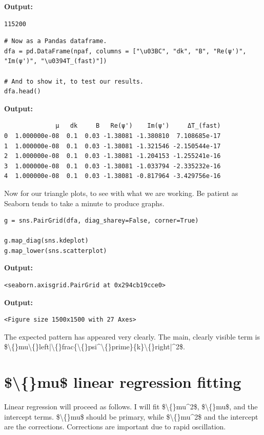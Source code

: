 \documentclass{article}
\begin{document}
\textbf{Output:}\begin{verbatim}
115200

\end{verbatim}

\begin{lstlisting}
# Now as a Pandas dataframe.
dfa = pd.DataFrame(npaf, columns = ["\u03BC", "dk", "B", "Re(ψ')", "Im(ψ')", "\u0394T_(fast)"])

# And to show it, to test our results.
dfa.head()\end{lstlisting}

\textbf{Output:}\begin{verbatim}
              μ   dk     B   Re(ψ')    Im(ψ')     ΔT_(fast)
0  1.000000e-08  0.1  0.03 -1.38081 -1.380810  7.108685e-17
1  1.000000e-08  0.1  0.03 -1.38081 -1.321546 -2.150544e-17
2  1.000000e-08  0.1  0.03 -1.38081 -1.204153 -1.255241e-16
3  1.000000e-08  0.1  0.03 -1.38081 -1.033794 -2.335232e-16
4  1.000000e-08  0.1  0.03 -1.38081 -0.817964 -3.429756e-16
\end{verbatim}

Now for our triangle plots, to see with what we are working. Be patient as Seaborn tends to take a minute to produce graphs.

\begin{lstlisting}
g = sns.PairGrid(dfa, diag_sharey=False, corner=True)

g.map_diag(sns.kdeplot)
g.map_lower(sns.scatterplot)\end{lstlisting}

\textbf{Output:}\begin{verbatim}
<seaborn.axisgrid.PairGrid at 0x294cb19cce0>
\end{verbatim}

\textbf{Output:}\begin{verbatim}
<Figure size 1500x1500 with 27 Axes>
\end{verbatim}

The expected pattern has appeared very clearly. The main, clearly visible term is \$\textbackslash\{\}mu\textbackslash\{\}left|\textbackslash\{\}frac\{\textbackslash\{\}psi\textasciicircum{}\textbackslash\{\}prime\}\{k\}\textbackslash\{\}right|\textasciicircum{}2\$.

\section{\$\textbackslash\{\}mu\$ linear regression fitting}

Linear regression will proceed as follows. I will fit \$\textbackslash\{\}mu\textasciicircum{}2\$, \$\textbackslash\{\}mu\$, and the intercept terms. \$\textbackslash\{\}mu\$ should be primary, while \$\textbackslash\{\}mu\textasciicircum{}2\$ and the intercept are the corrections. Corrections are important due to rapid oscillation.
\end{document}
